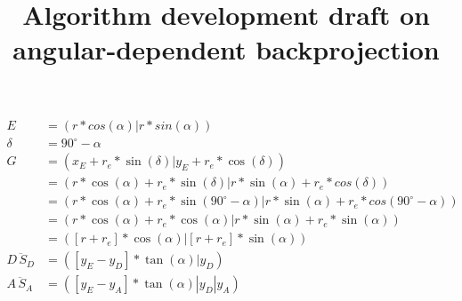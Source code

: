 \documentclass[a4paper,10pt,fleqn]{scrartcl}
\date{}
\title{Algorithm development draft on angular-dependent backprojection}
\begin{document}
\maketitle
\begin{align}
E &= (r * cos(\alpha) | r * sin(\alpha)) \\
\delta &= 90^\circ - \alpha \\
G &= (x_E + r_e * \sin(\delta) | y_E + r_e * \cos(\delta)) \\
  &= (r * \cos(\alpha) + r_e * \sin(\delta) | r * \sin(\alpha) + r_e * cos(\delta))\\
  &= (r * \cos(\alpha) + r_e * \sin(90^\circ - \alpha) | r * \sin(\alpha) + r_e * cos(90^\circ - \alpha))\\
  &= (r * \cos(\alpha) + r_e * \cos(\alpha) | r * \sin(\alpha) + r_e * \sin(\alpha))\\
  &= ([r + r_e] * \cos(\alpha) | [r + r_e] * \sin(\alpha))\\
\overline{D\,S_D} &= ([y_E - y_D] * \tan(\alpha)| y_D)\\
\overline{A\,S_A} &= ([y_E - y_A] * \tan(\alpha)| y_D | y_A )
\end{align}
\end{document}
